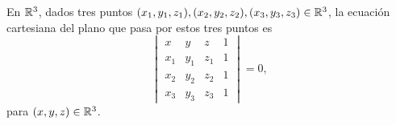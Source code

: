 \documentclass[a4,11pt]{aleph-notas}
\begin{document}
\begin{advertencia}
    En $\mathbb{R}^3$, dados tres puntos $(x_1,y_1,z_1),(x_2,y_2,z_2),(x_3,y_3,z_3)\in\mathbb{R}^3$, la ecuación cartesiana del plano que pasa por estos tres puntos es
    \[
        \begin{vmatrix}
            x & y & z & 1\\
            x_1 & y_1 & z_1 & 1\\
            x_2 & y_2 & z_2 & 1\\
            x_3 & y_3 & z_3 & 1
        \end{vmatrix}
        = 0,
    \]
    para $(x,y,z)\in\mathbb{R}^3$.
\end{advertencia}
\end{document}
